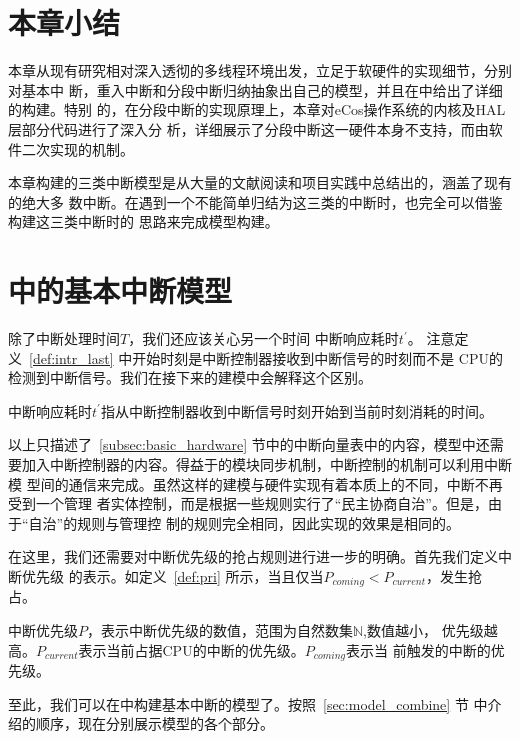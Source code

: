 \section{本章小结}
\label{sec:sum_3}

本章从现有研究相对深入透彻的多线程环境出发，立足于软硬件的实现细节，分别对基本中
断，重入中断和分段中断归纳抽象出自己的模型，并且在\uppaal 中给出了详细的构建。特别
的，在分段中断的实现原理上，本章对eCos操作系统的内核及HAL层部分代码进行了深入分
析，详细展示了分段中断这一硬件本身不支持，而由软件二次实现的机制。

本章构建的三类中断模型是从大量的文献阅读和项目实践中总结出的，涵盖了现有的绝大多
数中断。在遇到一个不能简单归结为这三类的中断时，也完全可以借鉴构建这三类中断时的
思路来完成模型构建。

\section{\uppaal 中的基本中断模型}
\label{subsec:basic_uppaal}

除了中断处理时间$T$，我们还应该关心另一个时间 \pozhehao 中断响应耗时$t^\prime$。
注意定义~\ref{def:intr_last} 中开始时刻是中断控制器接收到中断信号的时刻而不是
CPU的检测到中断信号。我们在接下来的建模中会解释这个区别。

\begin{definition}
	中断响应耗时$t^\prime$指从中断控制器收到中断信号时刻开始到当前时刻消耗的时间。
	\label{def:intr_last}
\end{definition}

以上只描述了~\ref{subsec:basic_hardware} 节中的中断向量表中的内容，模型中还需
要加入中断控制器的内容。得益于\uppaal 的模块同步机制，中断控制的机制可以利用中断模
型间的通信来完成。虽然这样的建模与硬件实现有着本质上的不同，中断不再受到一个管理
者实体控制，而是根据一些规则实行了“民主协商自治”。但是，由于“自治”的规则与管理控
制的规则完全相同，因此实现的效果是相同的。

在这里，我们还需要对中断优先级的抢占规则进行进一步的明确。首先我们定义中断优先级
的表示。如定义~\ref{def:pri} 所示，当且仅当$P_{coming} < P_{current}$，发生抢
占。

\begin{definition}
	中断优先级$P$，表示中断优先级的数值，范围为自然数集$\mathbb{N}$,数值越小，
	优先级越高。$P_{current}$表示当前占据CPU的中断的优先级。$P_{coming}$表示当
	前触发的中断的优先级。
	\label{def:pri}
\end{definition}

至此，我们可以在\uppaal 中构建基本中断的模型了。按照~\ref{sec:model_combine} 节
中介绍的顺序，现在分别展示模型的各个部分。

